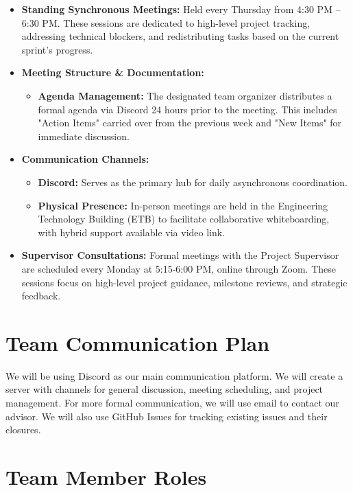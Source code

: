 \documentclass{article}
\begin{document}
\begin{itemize}
    \item \textbf{Standing Synchronous Meetings:} Held every Thursday from 4:30 PM -- 6:30 PM. These sessions are dedicated to high-level project tracking, addressing technical blockers, and redistributing tasks based on the current sprint's progress.
    \item \textbf{Meeting Structure \& Documentation:} 
    \begin{itemize}
        \item \textbf{Agenda Management:} The designated team organizer distributes a formal agenda via Discord 24 hours prior to the meeting. This includes "Action Items" carried over from the previous week and "New Items" for immediate discussion.
    \end{itemize}
    \item \textbf{Communication Channels:} 
    \begin{itemize}
        \item \textbf{Discord:} Serves as the primary hub for daily asynchronous coordination.
        \item \textbf{Physical Presence:} In-person meetings are held in the Engineering Technology Building (ETB) to facilitate collaborative whiteboarding, with hybrid support available via video link.
    \end{itemize}
    \item \textbf{Supervisor Consultations:} Formal meetings with the Project Supervisor are scheduled every Monday at 5:15-6:00 PM, online through Zoom. These sessions focus on high-level project guidance, milestone reviews, and strategic feedback.
\end{itemize}

\section{Team Communication Plan}


We will be using Discord as our main communication 
platform. We will create a server with channels for general 
discussion, meeting scheduling, and project management.
For more formal communication, we will use email to contact 
our advisor.
We will also use GitHub Issues for tracking existing 
issues and their closures.

\newpage{}
\section{Team Member Roles}
\end{document}
